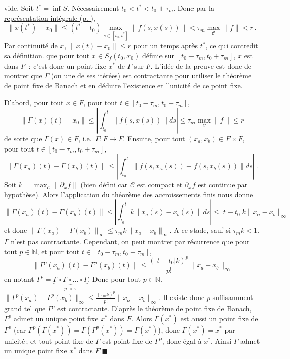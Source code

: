 \begin{preuve}
{  vide. Soit \(t^*=\inf S\). Nécessairement \(t_0 < t^* < t_0+\tau_m\).
  Donc par la \protect\hyperlink{theo_eq_integrale}{représentation
  intégrale (p. \pageref*{theo_eq_integrale})}, \[
  \|x(t^*)-x_0\|\leq (t^*-t_0) \max_{s\in [t_0,t^*]} \|f(s,x(s)) \| < \tau_m \max_\mathcal{C}\|f\|< r \ .
  \] Par continuité de \(x\), \(\|x(t)-x_0\|\leq r\) pour un temps après
  \(t^*\), ce qui contredit sa définition.} que pour tout
\(x\in S_f(t_0,x_0)\) définie sur
\(\left[t_0-\tau_m,t_0+\tau_m \right]\), \(x\) est dans \(F\)~: c'est
donc un point fixe \(x^*\) de \(\Gamma\) sur \(F\). L'idée de la preuve
est donc de montrer que \(\Gamma\) (ou une de ses itérées) est
contractante pour utiliser le théorème de point fixe de Banach et en
déduire l'existence et l'unicité de ce point fixe.

D'abord, pour tout \(x\in F\), pour tout
\(t\in \left[t_0-\tau_m,t_0+\tau_m \right]\), \[
\|\Gamma(x)(t)-x_0\| \leq \left|\int_{t_0}^t \|f(s,x(s))\| ds \right| \leq \tau_m \max_{\mathcal{C}} \|f\| \leq r
\] de sorte que \(\Gamma(x)\in F\), i.e.~\(\Gamma:F\to F\). Ensuite,
pour tout \((x_a,x_b)\in F\times F\), pour tout
\(t\in \left[t_0-\tau_m,t_0+\tau_m \right]\), \[
\|\Gamma(x_a)(t)-\Gamma(x_b)(t)\|\leq \left|\int_{t_0}^t \|f(s,x_a(s))-f(s,x_b(s))\| ds \right| \ .
\] Soit \(k=\max_\mathcal{C}\left\|\partial_x f \right\|\) (bien défini
car \(\mathcal{C}\) est compact et \(\partial_x f\) est continue par
hypothèse). Alors l'application du théorème des accroissements finis nous
donne \[
\|\Gamma(x_a)(t)-\Gamma(x_b)(t)\|\leq  \left|\int_{t_0}^t k\|x_a(s)-x_b(s)\| ds \right| \leq |t-t_0| k \|x_a-x_b\|_{\infty} 
\] et donc
\(\|\Gamma(x_a)-\Gamma(x_b)\|_\infty \leq \tau_m k \|x_a-x_b\|_{\infty}\).
A ce stade, sauf si \(\tau_m k<1\), \(\Gamma\) n'est pas contractante.
Cependant, on peut montrer par récurrence que pour tout
\(p\in \mathbb{N}\), et pour tout
\(t\in \left[t_0-\tau_m,t_0+\tau_m \right]\), \[
\|\Gamma^p(x_a)(t)-\Gamma^p(x_b)(t)\| \leq \frac{(|t-t_0| k)^p}{p!} \|x_a-x_b\|_{\infty}
\] en notant
\(\Gamma^p = \underbrace{\Gamma \circ \Gamma \circ \ldots \circ \Gamma}_{p \text{ fois }}\).
Donc pour tout \(p\in \mathbb{N}\),
\(\|\Gamma^p(x_a)-\Gamma^p(x_b)\|_\infty \leq \frac{(\tau_m k)^p}{p!} \|x_a-x_b\|_{\infty}\).
Il existe donc \(p\) suffisamment grand tel que \(\Gamma^{p}\) est
contractante. D'après le théorème de point fixe de Banach, \(\Gamma^p\)
admet un unique point fixe \(x^*\) dans \(F\). Alors \(\Gamma(x^*)\) est
aussi un point fixe de \(\Gamma^p\) (car
\(\Gamma^p(\Gamma(x^*)) = \Gamma(\Gamma^p(x^*)) = \Gamma(x^*)\)), donc
\(\Gamma(x^*)=x^*\) par unicité\,; et tout point fixe de \(\Gamma\) est
point fixe de \(\Gamma^p\), donc égal à \(x^*\). Ainsi \(\Gamma\) admet un
unique point fixe \(x^*\) dans \(F\).\hfill$\blacksquare$
\end{preuve}

